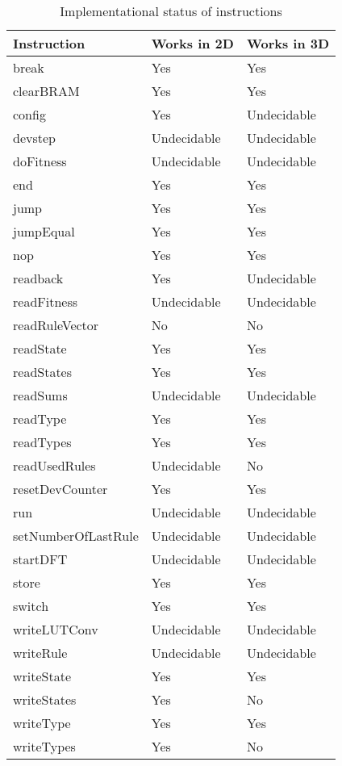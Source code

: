 \begin{table}[!ht]
    \renewcommand{\arraystretch}{1.3}
    \caption{Implementational status of instructions}
    \label{tab:instructions}
    \centering
    \begin{tabular}{l|l|l}
        \bfseries Instruction & \bfseries Works in 2D & \bfseries Works in 3D \\
        \hline
        break & Yes & Yes \\
        clearBRAM & Yes & Yes \\
        config & Yes & Undecidable \\
        devstep & Undecidable & Undecidable \\
        doFitness & Undecidable & Undecidable \\
        end & Yes & Yes \\
        jump & Yes & Yes \\
        jumpEqual & Yes & Yes \\
        nop & Yes & Yes \\
        readback & Yes & Undecidable \\
        readFitness & Undecidable & Undecidable \\
        readRuleVector & No & No \\
        readState & Yes & Yes \\
        readStates & Yes & Yes \\
        readSums & Undecidable & Undecidable \\
        readType & Yes & Yes \\
        readTypes & Yes & Yes \\
        readUsedRules & Undecidable & No \\
        resetDevCounter & Yes & Yes \\
        run & Undecidable & Undecidable \\
        setNumberOfLastRule & Undecidable & Undecidable \\
        startDFT & Undecidable & Undecidable \\
        store & Yes & Yes \\
        switch & Yes & Yes \\
        writeLUTConv & Undecidable & Undecidable \\
        writeRule & Undecidable & Undecidable \\
        writeState & Yes & Yes \\
        writeStates & Yes & No \\
        writeType & Yes & Yes \\
        writeTypes & Yes & No \\
    \end{tabular}
\end{table}


